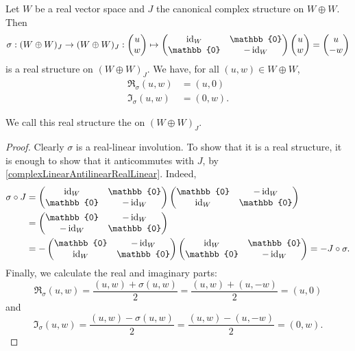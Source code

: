 \begin{lemma}
Let $W$ be a real vector space and $J$ the canonical complex structure on $W\oplus W$. Then
\[ \sigma: (W\oplus W)_J \to (W\oplus W)_J: \begin{pmatrix}
u \\ w
\end{pmatrix} \mapsto \begin{pmatrix}
\id_W & \mathbb{0} \\
\mathbb{0} & -\id_W
\end{pmatrix}\begin{pmatrix}
u \\ w
\end{pmatrix} = \begin{pmatrix}
u \\ -w
\end{pmatrix} \]
is a real structure on $(W\oplus W)_J$. We have, for all $(u,w)\in W\oplus W$,
\begin{align*}
\Re_\sigma(u,w) &= (u,0) \\
\Im_\sigma(u,w) &= (0,w).
\end{align*}
\end{lemma}
We call this real structure the  on $(W\oplus W)_J$.
\begin{proof}
Clearly $\sigma$ is a real-linear involution. To show that it is a real structure, it is enough to show that it anticommutes with $J$, by \ref{complexLinearAntilinearRealLinear}. Indeed,
\begin{align*}
\sigma\circ J &= \begin{pmatrix}
\id_W & \mathbb{0} \\
\mathbb{0} & -\id_W
\end{pmatrix}\begin{pmatrix}
\mathbb{0} & -\id_W \\
\id_W & \mathbb{0}
\end{pmatrix} \\
&= \begin{pmatrix}
\mathbb{0} & -\id_W \\
-\id_W & \mathbb{0}
\end{pmatrix} \\
&= -\begin{pmatrix}
\mathbb{0} & -\id_W \\
\id_W & \mathbb{0}
\end{pmatrix}\begin{pmatrix}
\id_W & \mathbb{0} \\
\mathbb{0} & -\id_W
\end{pmatrix} = -J\circ \sigma.
\end{align*}
Finally, we calculate the real and imaginary parts:
\[ \Re_\sigma(u,w) = \frac{(u,w)+\sigma(u,w)}{2} = \frac{(u,w)+(u,-w)}{2} = (u,0) \]
and
\[ \Im_\sigma(u,w) = \frac{(u,w)-\sigma(u,w)}{2} = \frac{(u,w)-(u,-w)}{2} = (0,w). \]
\end{proof}







